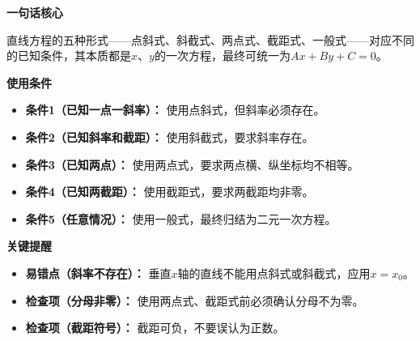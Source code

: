 \begin{summarybox}

	\textbf{\textcolor{CSummary}{一句话核心}}

	直线方程的五种形式——点斜式、斜截式、两点式、截距式、一般式——对应不同的已知条件，其本质都是$x$、$y$的一次方程，最终可统一为$Ax+By+C=0$。

	\medskip
	\textbf{\textcolor{CSummary}{使用条件}}
	\begin{itemize}[leftmargin=*, itemsep=0.5em, topsep=0.4em]
		\item \textbf{条件1（已知一点一斜率）：} 使用点斜式，但斜率必须存在。
		\item \textbf{条件2（已知斜率和截距）：} 使用斜截式，要求斜率存在。
		\item \textbf{条件3（已知两点）：} 使用两点式，要求两点横、纵坐标均不相等。
		\item \textbf{条件4（已知两截距）：} 使用截距式，要求两截距均非零。
		\item \textbf{条件5（任意情况）：} 使用一般式，最终归结为二元一次方程。
	\end{itemize}

	\medskip
	\textbf{\textcolor{CSummary}{关键提醒}}
	\begin{itemize}[leftmargin=*, itemsep=0.5em, topsep=0.4em]
		\item \textbf{易错点（斜率不存在）：} 垂直$x$轴的直线不能用点斜式或斜截式，应用$x=x_0$。
		\item \textbf{检查项（分母非零）：} 使用两点式、截距式前必须确认分母不为零。
		\item \textbf{检查项（截距符号）：} 截距可负，不要误认为正数。
	\end{itemize}
\end{summarybox}
